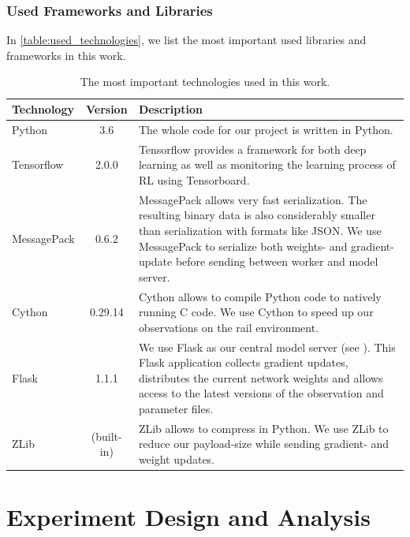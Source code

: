 \subsection*{Used Frameworks and Libraries}\label{framework_and_libraries}
In \autoref{table:used_technologies}, we list the most important used libraries and frameworks in this work.
\begin{table}[H]
	\centering
	\begin{tabularx}{\textwidth}{ |l|c|X| } 
		\hline
		\textbf{Technology}	& \textbf{Version} & \textbf{Description}\\
		\hline
		Python & 3.6 & The whole code for our project is written in Python.\\
		\hline
		Tensorflow & 2.0.0 & Tensorflow provides a framework for both deep learning as well as monitoring the learning process of RL using Tensorboard.\\
		\hline
		MessagePack & 0.6.2 & MessagePack allows very fast serialization. The resulting binary data is also considerably smaller than serialization with formats like JSON. We use MessagePack to serialize both weights- and gradient-update before sending between worker and model server.\\
		\hline
		Cython & 0.29.14 & Cython allows to compile Python code to natively running C code. We use Cython to speed up our observations on the rail environment.\\
		\hline
		Flask & 1.1.1 & We use Flask as our central model server (see \nameref{dist_architecture}). This Flask application collects gradient updates, distributes the current network weights and allows access to the latest versions of the observation and parameter files.\\
		\hline
		ZLib & (built-in) & ZLib allows to compress in Python. We use ZLib to reduce our payload-size while sending gradient- and weight updates.\\
		\hline
	\end{tabularx}
	\caption{The most important technologies used in this work.}
	\label{table:used_technologies}
\end{table}
\chapter{Experiment Design and Analysis}
\label{chap.experiment}

